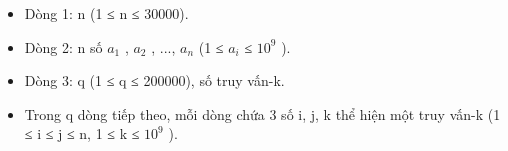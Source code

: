 \begin{itemize}
	\item     Dòng 1: n (1 ≤ n ≤ 30000).   
	\item     Dòng 2: n số $a_{1}$    , $a_{2}$    , ...,   $a_{n}$    (1 ≤ $a_{i}$    ≤   $10^{9}$    ).   
	\item     Dòng 3: q (1 ≤ q ≤ 200000), số truy vấn-k.   
	\item     Trong q dòng tiếp theo, mỗi dòng chứa 3 số i, j, k   thể hiện một truy vấn-k (1 ≤ i ≤ j ≤ n, 1 ≤ k ≤   $10^{9}$    ).   
\end{itemize}
